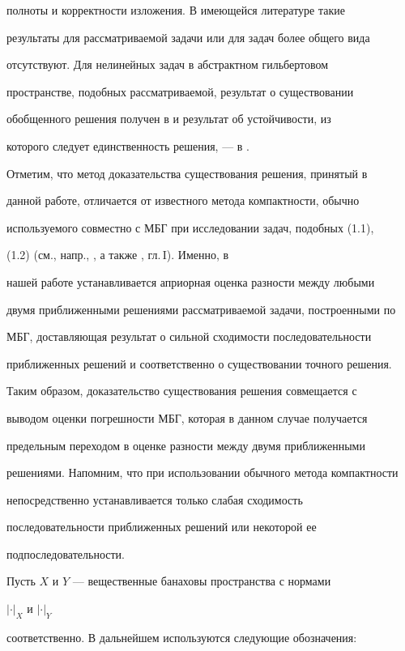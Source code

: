 полноты и корректности изложения. В имеющейся литературе такие 


результаты для рассматриваемой задачи или для задач более общего вида 


отсутствуют. Для нелинейных задач в абстрактном гильбертовом 


пространстве, подобных рассматриваемой, результат о существовании 


обобщенного решения получен в \cite{10} и результат об устойчивости, из 


которого следует единственность решения, --- в \cite{11}. 


 


Отметим, что метод доказательства существования решения, принятый в 


данной работе, отличается от известного метода компактности, обычно 


используемого совместно с МБГ при исследовании задач, подобных (1.1), 


(1.2) (см., напр., \cite{10}, а также \cite{12}, гл.\,I). Именно, в 


нашей работе устанавливается априорная оценка разности между любыми 


двумя приближенными решениями рассматриваемой задачи, построенными по 


МБГ, доставляющая результат о сильной сходимости последовательности 


приближенных решений и соответственно о существовании точного решения. 


Таким образом, доказательство существования решения совмещается с 


выводом оценки погрешности МБГ, которая в данном случае получается 


предельным переходом в оценке разности между двумя приближенными 


решениями. Напомним, что при использовании обычного метода компактности 


непосредственно устанавливается только слабая сходимость 


последовательности приближенных решений или некоторой ее 


подпоследовательности. 


 


Пусть $X$ и $Y$ --- вещественные банаховы пространства с нормами 


$|\cdot|_X$ и $|\cdot|_Y$ 


соответственно. В дальнейшем используются следующие обозначения: 


